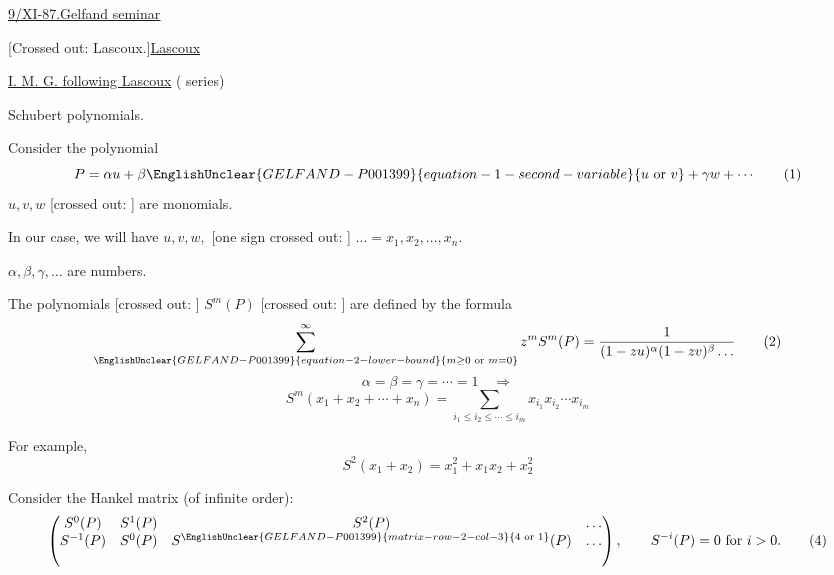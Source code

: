 \underline{9/XI-87.}\qquad \underline{\underline{Gelfand seminar}}

[Crossed out: Lascoux.]\qquad \underline{Lascoux}

\underline{I. M. G. following Lascoux}
( series)

Schubert polynomials.

Consider the polynomial
\begin{equation*}
P=\alpha u+\beta\EnglishUnclear{GELFAND-P001399}{equation-1-second-variable}{u\text{ or }v}+\gamma w+\cdots \tag{1}
\end{equation*}
$u,v,w$ [crossed out: ] are monomials.

In our case, we will have $u,v,w,$ [one sign crossed out:
] $\ldots=x_1,x_2,\ldots,x_n$.

$\alpha,\beta,\gamma,\ldots$ are numbers.

The polynomials [crossed out: ]
$S^m(P)$ [crossed out: ]
are defined by the formula
\begin{equation*}
\sum_{\EnglishUnclear{GELFAND-P001399}{equation-2-lower-bound}{m\ge0\text{ or }m=0}}^{\infty}
z^m S^m(P)=\frac{1}{(1-zu)^\alpha(1-zv)^\beta\ldots} \tag{2}
\end{equation*}
\begin{equation*}
\alpha=\beta=\gamma=\cdots=1\quad\Rightarrow
\end{equation*}
\begin{equation*}
S^m(x_1+x_2+\cdots+x_n)=\sum_{i_1\le i_2\le\cdots\le i_m}
x_{i_1}x_{i_2}\cdots x_{i_m} \tag{3}
\end{equation*}

For example,
\begin{equation*}
S^2(x_1+x_2)=x_1^2+x_1x_2+x_2^2
\end{equation*}

Consider the Hankel matrix (of infinite order):
\begin{equation*}
\begin{pmatrix}
S^0(P)&S^1(P)&S^2(P)&\ldots\\
S^{-1}(P)&S^0(P)&S^{\EnglishUnclear{GELFAND-P001399}{matrix-row-2-col-3}{4\text{ or }1}}(P)&\ldots\\
&&&
\end{pmatrix},\qquad S^{-i}(P)=0\text{ for }i>0. \tag{4}
\end{equation*}

